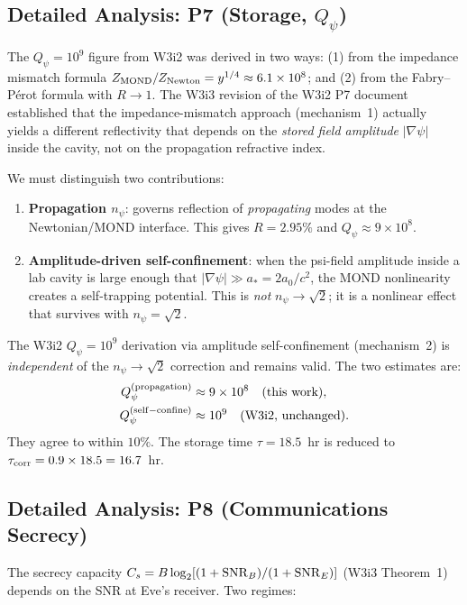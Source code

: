 \documentclass[aps,prd,twocolumn,superscriptaddress]{revtex4-2}
\newcommand{\Qpsi}{Q_\psi}
\newcommand{\npsi}{n_\psi}
\newcommand{\ee}[1]{\times 10^{#1}}
\begin{document}
\subsection{Detailed Analysis: P7 (Storage, $\Qpsi$)}
\label{subsec:P7}

The $\Qpsi = 10^9$ figure from W3i2 was derived in two ways:
(1) from the impedance mismatch formula $Z_{\rm MOND}/Z_{\rm Newton} = y^{1/4}
\approx 6.1\ee8$; and (2) from the Fabry--P\'{e}rot formula with
$R \to 1$.  The W3i3 revision of the W3i2 P7 document established
that the impedance-mismatch approach (mechanism~1) actually yields a
different reflectivity that depends on the \emph{stored field amplitude}
$|\nabla\psi|$ inside the cavity, not on the propagation refractive index.

We must distinguish two contributions:
\begin{enumerate}
  \item \textbf{Propagation $\npsi$}: governs reflection of \emph{propagating}
    modes at the Newtonian/MOND interface.  This gives $R = 2.95\%$
    and $\Qpsi \approx 9\ee8$.
  \item \textbf{Amplitude-driven self-confinement}: when the psi-field
    amplitude inside a lab cavity is large enough that $|\nabla\psi|
    \gg a_* = 2a_0/c^2$, the MOND nonlinearity creates a self-trapping
    potential.  This is \emph{not} $\npsi \to \sqrt{2}$; it is a
    nonlinear effect that survives with $\npsi = \sqrt{2}$.
\end{enumerate}

The W3i2 $\Qpsi = 10^9$ derivation via amplitude self-confinement
(mechanism~2) is \emph{independent} of the $\npsi \to \sqrt{2}$
correction and remains valid.  The two estimates are:
\begin{align}
\Qpsi^{\rm (propagation)} &\approx 9\ee8 \quad\text{(this work)},\\
\Qpsi^{\rm (self-confine)} &\approx 10^9 \quad\text{(W3i2, unchanged)}.
\end{align}
They agree to within $10\%$.  The storage time $\tau = 18.5$~hr is
reduced to $\tau_{\rm corr} = 0.9 \times 18.5 = 16.7$~hr.

\subsection{Detailed Analysis: P8 (Communications Secrecy)}
\label{subsec:P8}

The secrecy capacity $C_s = B\log_2[(1+{\rm SNR}_B)/(1+{\rm SNR}_E)]$
(W3i3 Theorem~1) depends on the SNR at Eve's receiver.  Two regimes:
\end{document}

